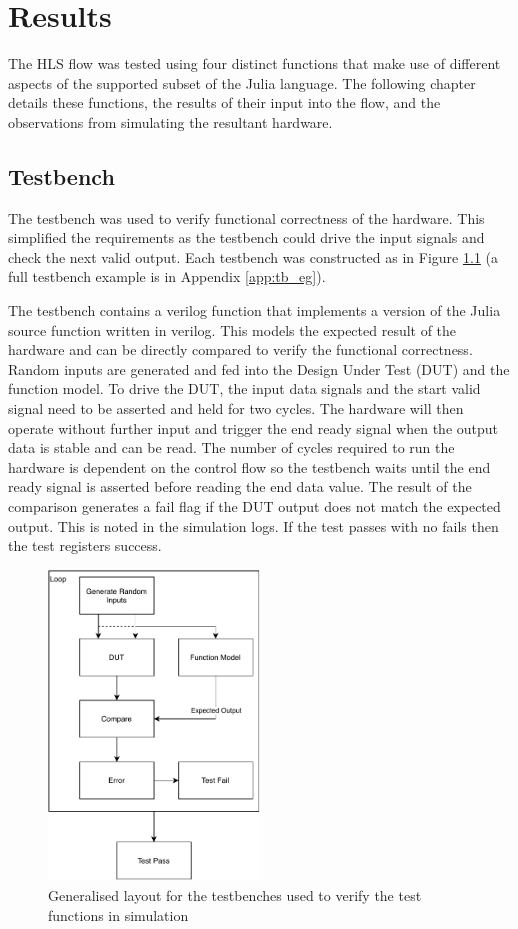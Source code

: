 \chapter{Results}
The HLS flow was tested using four distinct functions that make use of different aspects of the supported subset of the Julia language. The following chapter details these functions, the results of their input into the flow, and the observations from simulating the resultant hardware.

\pagebreak

\section{Testbench}
The testbench was used to verify functional correctness of the hardware. This simplified the requirements as the testbench could drive the input signals and check the next valid output. Each testbench was constructed as in Figure \ref{fig:gen_tb} (a full testbench example is in Appendix \ref{app:tb_eg}). 

The testbench contains a verilog function that implements a version of the Julia source function written in verilog. This models the expected result of the hardware and can be directly compared to verify the functional correctness. Random inputs are generated and fed into the Design Under Test (DUT) and the function model. To drive the DUT, the input data signals and the start valid signal need to be asserted and held for two cycles. The hardware will then operate without further input and trigger the end ready signal when the output data is stable and can be read. The number of cycles required to run the hardware is dependent on the control flow so the testbench waits until the end ready signal is asserted before reading the end data value. The result of the comparison generates a fail flag if the DUT output does not match the expected output. This is noted in the simulation logs. If the test passes with no fails then the test registers success.

\begin{figure}[htb!]
    \centering
    \includegraphics[width=0.5\textwidth]{Images/generic_tb.pdf}
    \caption{Generalised layout for the testbenches used to verify the test functions in simulation}
    \label{fig:gen_tb}
\end{figure}

